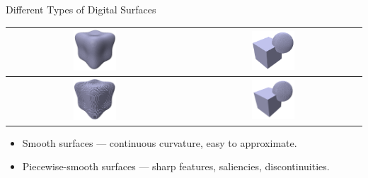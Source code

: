\documentclass[11pt]{beamer}
\begin{document}
    \begin{frame}{Different Types of Digital Surfaces}
        \centering
        \begin{tabular}{|c|c|}
            \hline
            \includegraphics[width=0.25\textwidth]{pictures/smooth_smooth_f3} &
            \includegraphics[width=0.25\textwidth]{pictures/piecewise_smooth_smooth_f3} \\
            \hline
            \includegraphics[width=0.25\textwidth]{pictures/smooth_discrete_f3} &
            \includegraphics[width=0.25\textwidth]{pictures/piecewise_smooth_discrete_f3} \\
            \hline
        \end{tabular}
        \begin{itemize}
            \item Smooth surfaces — continuous curvature, easy to approximate.
            \item Piecewise-smooth surfaces — sharp features, saliencies, discontinuities.
        \end{itemize}
    \end{frame}
\end{document}

